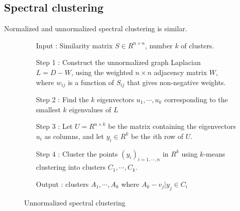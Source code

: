 \newpage

\subsection{Spectral clustering}
Normalized and unnormalized spectral clustering is similar.

\begin{figure}[ht]
\begin{mdframed}
\begin{enumerate}
\item[Input] : Similarity matrix $S \in R^{n \times n}$, number $k$ of clusters. \\
\item[Step 1] : Construct the unnormalized graph Laplacian $L = D - W$, using the weighted $n \times n$ adjacency matrix $W$, where $w_{ij}$ is a function of $S_{ij}$ that gives non-negative weights. \\
\item[Step 2] : Find the $k$ eigenvectors $u_1, \cdots, u_k$ corresponding to the smallest $k$ eigenvalues of $L$ \\
\item[Step 3] : Let $U = R^{n \times k}$ be the matrix containing the eigenvectors $u_i$ as columns, and let $y_i \in R^k$ be the $i$th row of $U$.\\
\item[Step 4] : Cluster the points $(y_i)_{i=1,\cdots,n}$ in $R^k$ using $k$-means clustering into clusters $C_1,\cdots,C_k$.\\
\item[Output] : clusters $A_1, \cdots, A_k$ where $A_k - {v_j|y_j \in C_i}$
\end{enumerate}
\end{mdframed}
\caption{Unnormalized spectral clustering}
\end{figure}

